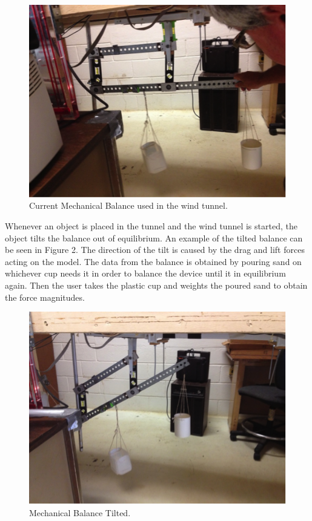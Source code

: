 		\begin{figure}[H]
			\centering
				\includegraphics[scale=0.7]{img/intro-1}
			\caption{Current Mechanical Balance used in the wind tunnel.}
		\end{figure}

		Whenever an object is placed in the tunnel and the wind tunnel is started, the object tilts the
		balance out of equilibrium. An example of the tilted balance can be seen in Figure 2. The direction 
		of the tilt is caused by the drag and lift forces acting on the model. The data from the balance is 
		obtained by pouring sand on whichever cup needs it in order to balance the device until 
		it in equilibrium again. Then the user takes the plastic cup and weights the poured sand to obtain
		the force magnitudes.

		\begin{figure}[H]
			\centering
				\includegraphics[scale=0.7]{img/intro-2}
			\caption{Mechanical Balance Tilted.}
		\end{figure}
		
